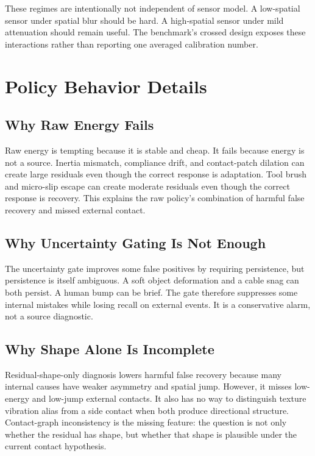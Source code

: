 \documentclass{article}
\begin{document}
These regimes are intentionally not independent of sensor model. A low-spatial sensor under spatial blur should be hard. A high-spatial sensor under mild attenuation should remain useful. The benchmark's crossed design exposes these interactions rather than reporting one averaged calibration number.

\section{Policy Behavior Details}

\subsection{Why Raw Energy Fails}

Raw energy is tempting because it is stable and cheap. It fails because energy is not a source. Inertia mismatch, compliance drift, and contact-patch dilation can create large residuals even though the correct response is adaptation. Tool brush and micro-slip escape can create moderate residuals even though the correct response is recovery. This explains the raw policy's combination of harmful false recovery and missed external contact.

\subsection{Why Uncertainty Gating Is Not Enough}

The uncertainty gate improves some false positives by requiring persistence, but persistence is itself ambiguous. A soft object deformation and a cable snag can both persist. A human bump can be brief. The gate therefore suppresses some internal mistakes while losing recall on external events. It is a conservative alarm, not a source diagnostic.

\subsection{Why Shape Alone Is Incomplete}

Residual-shape-only diagnosis lowers harmful false recovery because many internal causes have weaker asymmetry and spatial jump. However, it misses low-energy and low-jump external contacts. It also has no way to distinguish texture vibration alias from a side contact when both produce directional structure. Contact-graph inconsistency is the missing feature: the question is not only whether the residual has shape, but whether that shape is plausible under the current contact hypothesis.
\end{document}
